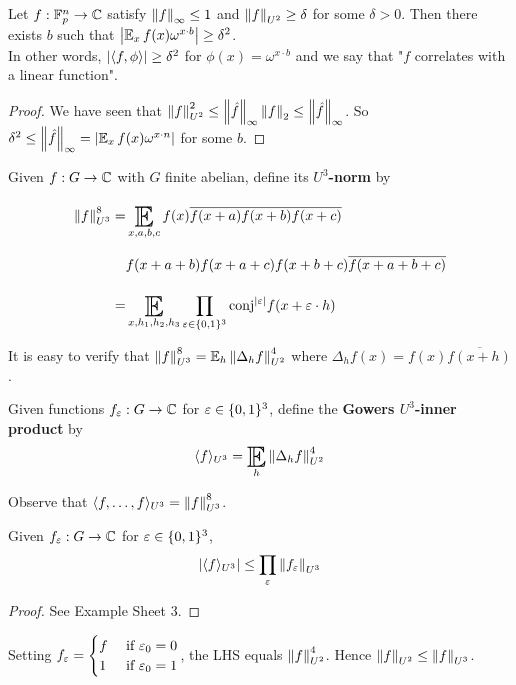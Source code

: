 \documentclass{article}
\begin{document}
\begin{nthm}
  Let $f : \mathbb F_p^n \to \mathbb C$ satisfy $\left\lVert f\right\rVert_\infty \le 1$ and $\left\lVert f\right\rVert_{U^2} \ge \delta$ for some $\delta > 0$. Then there exists $b$ such that $\abs{\E_x f(x) \omega^{x \cdot b}} \ge \delta^2$. \\
  In other words, $\left\lvert \left\langle f, \phi\right\rangle\right\rvert \ge \delta^2$ for $\phi(x) = \omega^{x \cdot b}$ and we say that "$f$ correlates with a linear function".
\end{nthm}
\begin{proof}
  We have seen that $\left\lVert f\right\rVert_{U^2}^2 \le \left\lVert \hat f\right\rVert_\infty \left\lVert f\right\rVert_2 \le \left\lVert \hat f\right\rVert_\infty$. So $\delta^2 \le \norm{\hat f}_\infty = \abs{\E_x f(x) \omega^{x \cdot n}}$ for some $b$.
\end{proof}

\begin{ndef}
  Given $f : G \to \mathbb C$ with $G$ finite abelian, define its {\bf $U^3$-norm} by
  \begin{align*}
    \norm f_{U^3}^8
    = & \E_{x, a, b, c} f(x) \overline{f(x + a) f(x + b) f(x + c)} \\
    & f(x + a + b) f(x + a + c) f(x + b + c) \overline{f(x + a + b + c)} \\
    = & \E_{x, h_1, h_2, h_3} \prod_{\eps \in \{0, 1\}^3} \mathrm{conj}^{\abs\eps} f(x + \eps \cdot h)
  \end{align*}
\end{ndef}

It is easy to verify that $\norm f_{U^3}^8 = \E_h \norm{\Delta_h f}_{U^2}^4$ where $\Delta_h f(x) = f(x) \overline{f(x + h)}$.

\begin{ndef}
  Given functions $f_\varepsilon : G \to \mathbb C$ for $\varepsilon \in \{0, 1\}^3$, define the {\bf Gowers $U^3$-inner product} by
  $$\langle f\rangle_{U^3} = \E_h \norm{\Delta_h f}_{U^2}^4$$
\end{ndef}

Observe that $\langle f, \dots, f\rangle_{U^3} = \left\lVert f\right\rVert_{U^3}^8$.

\begin{nlemma}
  Given $f_\varepsilon : G \to \mathbb C$ for $\varepsilon \in \{0, 1\}^3$,
  $$\left\lvert \langle f\rangle_{U^3}\right\rvert \le \prod_\varepsilon \left\lVert f_\varepsilon\right\rVert_{U^3}$$
\end{nlemma}
\begin{proof}
  See Example Sheet 3.
\end{proof}

Setting $f_\varepsilon = \begin{cases}
  f & \text{ if } \varepsilon_0 = 0 \\
  1 & \text{ if } \varepsilon_0 = 1
\end{cases}$, the LHS equals $\left\lVert f\right\rVert_{U^2}^4$. Hence $\left\lVert f\right\rVert_{U^2} \le \left\lVert f\right\rVert_{U^3}$.
\end{document}
